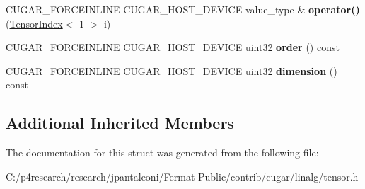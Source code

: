 \begin{DoxyCompactItemize}
C\+U\+G\+A\+R\+\_\+\+F\+O\+R\+C\+E\+I\+N\+L\+I\+NE C\+U\+G\+A\+R\+\_\+\+H\+O\+S\+T\+\_\+\+D\+E\+V\+I\+CE value\+\_\+type \& {\bfseries operator()} (\hyperlink{structcugar_1_1_tensor_index}{Tensor\+Index}$<$ 1 $>$ i)
\item 
\mbox{\label{structcugar_1_1_tensor_3_01_t_00_011_00_01_n_01_4_aad57fd9f099a1d35a24460b52fe00be2}} 
C\+U\+G\+A\+R\+\_\+\+F\+O\+R\+C\+E\+I\+N\+L\+I\+NE C\+U\+G\+A\+R\+\_\+\+H\+O\+S\+T\+\_\+\+D\+E\+V\+I\+CE uint32 {\bfseries order} () const
\item 
\mbox{\label{structcugar_1_1_tensor_3_01_t_00_011_00_01_n_01_4_adbc7b7d60e03bba1971834ab2487ef73}} 
C\+U\+G\+A\+R\+\_\+\+F\+O\+R\+C\+E\+I\+N\+L\+I\+NE C\+U\+G\+A\+R\+\_\+\+H\+O\+S\+T\+\_\+\+D\+E\+V\+I\+CE uint32 {\bfseries dimension} () const
\end{DoxyCompactItemize}
\subsection*{Additional Inherited Members}


The documentation for this struct was generated from the following file\+:\begin{DoxyCompactItemize}
\item 
C\+:/p4research/research/jpantaleoni/\+Fermat-\/\+Public/contrib/cugar/linalg/tensor.\+h\end{DoxyCompactItemize}
